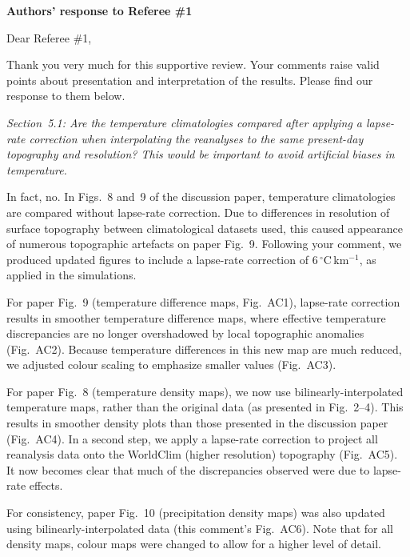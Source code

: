 \documentclass[10pt]{article}
\begin{document}
\textbf{Authors' response to Referee {\#}1}
\bigskip


\renewcommand\thefigure{AC\arabic{figure}}
\def\referee#1{\bigskip\textcolor{journalname}{\textit{#1}}}

Dear Referee {\#}1,

Thank you very much for this supportive review. Your comments raise valid points about presentation and interpretation of the results. Please find our response to them below.

\referee{Section~5.1: Are the temperature climatologies compared after applying a lapse-rate correction when interpolating the reanalyses to the same present-day topography and resolution? This would be important to avoid artificial biases in temperature.}

In fact, no. In Figs.~8 and~9 of the discussion paper, temperature climatologies are compared without lapse-rate correction. Due to differences in resolution of surface topography between climatological datasets used, this caused appearance of numerous topographic artefacts on paper Fig.~9. Following your comment, we produced updated figures to include a lapse-rate correction of 6\,{$^\circ$}C\,km$^{-1}$, as applied in the simulations.

For paper Fig.~9 (temperature difference maps, Fig.~AC1), lapse-rate correction results in smoother temperature difference maps, where effective temperature discrepancies are no longer overshadowed by local topographic anomalies (Fig.~AC2). Because temperature differences in this new map are much reduced, we adjusted colour scaling to emphasize smaller values (Fig.~AC3).

For paper Fig.~8 (temperature density maps), we now use bilinearly-interpolated temperature maps, rather than the original data (as presented in Fig.~2--4). This results in smoother density plots than those presented in the discussion paper (Fig.~AC4). In a second step, we apply a lapse-rate correction to project all reanalysis data onto the WorldClim (higher resolution) topography (Fig.~AC5). It now becomes clear that much of the discrepancies observed were due to lapse-rate effects.

For consistency, paper Fig.~10 (precipitation density maps) was also updated using bilinearly-interpolated data (this comment's Fig.~AC6). Note that for all density maps, colour maps were changed to allow for a higher level of detail.
\end{document}
